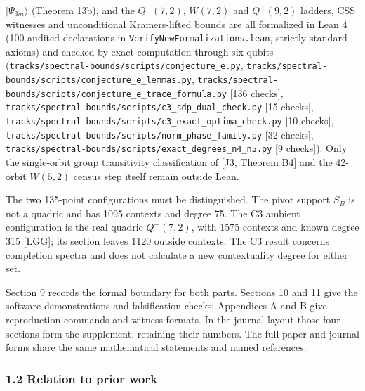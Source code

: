 \documentclass[11pt,a4paper]{article}
\begin{document}
\(|\Psi_{3m}\rangle\) (Theorem 13b), and the \(Q^-(7,2)\), \(W(7,2)\) and \(Q^+(9,2)\) ladders, CSS witnesses and
unconditional Kramers-lifted bounds are all formalized in Lean 4 (100 audited declarations in
\nolinkurl{VerifyNewFormalizations.lean}, strictly standard axioms) and checked by exact computation through six
qubits (\nolinkurl{tracks/spectral-bounds/scripts/conjecture_e.py}, \nolinkurl{tracks/spectral-bounds/scripts/conjecture_e_lemmas.py}, \nolinkurl{tracks/spectral-bounds/scripts/conjecture_e_trace_formula.py}
{[}136 checks{]}, \nolinkurl{tracks/spectral-bounds/scripts/c3_sdp_dual_check.py} {[}15 checks{]}, \nolinkurl{tracks/spectral-bounds/scripts/c3_exact_optima_check.py} {[}10 checks{]},
\nolinkurl{tracks/spectral-bounds/scripts/norm_phase_family.py} {[}32 checks{]}, \nolinkurl{tracks/spectral-bounds/scripts/exact_degrees_n4_n5.py} {[}9 checks{]}). Only the
single-orbit group transitivity classification of {[}J3, Theorem B4{]} and the 42-orbit \(W(5,2)\) census step
itself remain outside Lean.

The two 135-point configurations must be distinguished. The pivot support \(S_B\) is not a quadric and
has 1095 contexts and degree 75. The C3 ambient configuration is the real quadric \(Q^+(7,2)\), with
1575 contexts and known degree 315 {[}LGG{]}; its section leaves 1120 outside contexts. The C3 result
concerns completion spectra and does not calculate a new contextuality degree for either set.

Section 9 records the formal boundary for both parts. Sections 10 and 11 give the software
demonstrations and falsification checks; Appendices A and B give reproduction commands and witness
formats. In the journal layout those four sections form the supplement, retaining their numbers.
The full paper and journal forms share the same mathematical statements and named references.

\subsubsection{1.2 Relation to prior work}\label{12-relation-to-prior-work}
\end{document}
